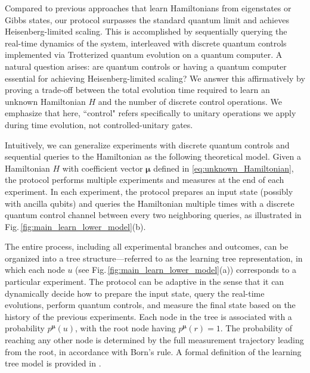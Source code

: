 \documentclass[twocolumn,superscriptaddress,aps,showpacs,amsmath,amstex,amssymb,citeautoscript,floatfix,pra,preprintnumbers]{revtex4-2}
\theoremstyle{plain}
\theoremstyle{plain}
\theoremstyle{plain}
\theoremstyle{plain}
\theoremstyle{plain}
\theoremstyle{plain}
\newcommand{\figref}[1]{Fig.\,\ref{#1}}
\begin{document}
Compared to previous approaches that learn Hamiltonians from eigenstates or Gibbs states, our protocol surpasses the standard quantum limit and achieves Heisenberg-limited scaling. This is accomplished by sequentially querying the real-time dynamics of the system, interleaved with discrete quantum controls implemented via Trotterized quantum evolution on a quantum computer. A natural question arises: are quantum controls or having a quantum computer essential for achieving Heisenberg-limited scaling? We answer this affirmatively by proving a trade-off between the total evolution time required to learn an unknown Hamiltonian $H$ and the number of discrete control operations. We emphasize that here, ``control" refers specifically to unitary operations we apply during time evolution, not controlled-unitary gates.



Intuitively, we can generalize experiments with discrete quantum controls and sequential queries to the Hamiltonian as the following theoretical model. 
Given a Hamiltonian $H$ with coefficient vector $\bm{\mu}$ defined in \eqref{eq:unknown_Hamiltonian}, the protocol performs multiple experiments and measures at the end of each experiment.
In each experiment, the protocol prepares an input state (possibly with ancilla qubits) and queries the Hamiltonian multiple times with a discrete quantum control channel between every two neighboring queries, as illustrated in \figref{fig:main_learn_lower_model}(b).

The entire process, including all experimental branches and outcomes, can be organized into a tree structure—referred to as the learning tree representation, in which each node $u$ (see \figref{fig:main_learn_lower_model}(a)) corresponds to a particular experiment. The protocol can be adaptive in the sense that it can dynamically decide how to prepare the input state, query the real-time evolutions, perform quantum controls, and measure the final state based on the history of the previous experiments. Each node in the tree is associated with a probability $p^{\bm{\mu}}(u)$, with the root node having $p^{\bm{\mu}}(r) = 1$. The probability of reaching any other node is determined by the full measurement trajectory leading from the root, in accordance with Born’s rule. A formal definition of the learning tree model is provided in .
\end{document}
